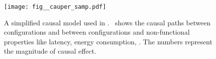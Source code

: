 \begin{figure}[t!]
    \setlength{\belowcaptionskip}{-1em}
    \centering

        \texttt{[image: fig\_\_cauper\_samp.pdf]}\label{fig:cauper_samp}
    
    \caption{\small A simplified causal model used in \tool. \protect\edgeone~shows the causal paths between configurations and between configurations and non-functional properties like latency, energy consumption, \etc. The numbers represent the magnitude of causal effect.}
    \label{fig:sample}
\end{figure}